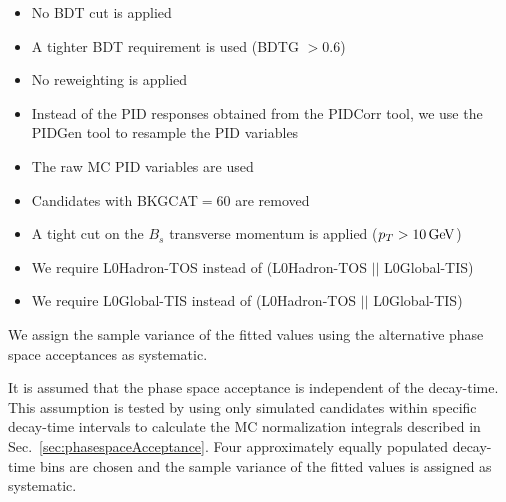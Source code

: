 \begin{itemize}

	\item No BDT cut is applied
	
	\item A tighter BDT requirement is used (BDTG $> 0.6$)
	
	
	\item No reweighting is applied 
	
	\item Instead of the PID responses obtained from the \textsf{PIDCorr} tool, we use the \textsf{PIDGen} tool to resample the PID variables \cite{LHCb-INT-2017-007}
	
	\item The raw MC PID variables are used
	
	\item Candidates with \textsf{BKGCAT}$=60$ are removed
	
	\item A tight cut on the $B_s$ transverse momentum is applied ($p_T > 10 \mathrm{\,Ge\kern -0.1em V}$)
	
	\item We require \textsf{L0Hadron}-TOS  instead of (\textsf{L0Hadron}-TOS $\vert \vert$   \textsf{L0Global}-TIS)
	
	\item We require \textsf{L0Global}-TIS  instead of (\textsf{L0Hadron}-TOS  $\vert \vert$  \textsf{L0Global}-TIS)
	
\end{itemize}
We assign the sample variance of the fitted values using the alternative phase space acceptances as systematic.

It is assumed that the phase space acceptance is independent of the decay-time. 
This assumption is tested by using only simulated candidates within specific decay-time intervals to calculate the MC normalization integrals described in Sec.~\ref{sec:phasespaceAcceptance}. Four approximately equally populated decay-time bins are chosen and the sample variance of the fitted values is assigned as systematic.


